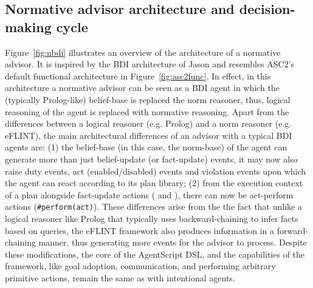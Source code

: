 \subsection{Normative advisor architecture and decision-making cycle}
Figure~\ref{fig:nbdi} illustrates an overview of the architecture of a normative advisor.
It is inspired by the BDI architecture of Jason \cite{Bordini2005} and resembles ASC2's default functional architecture in Figure~\ref{fig:asc2func}.
%
In effect, in this architecture a normative advisor can be seen as a BDI agent in which the (typically Prolog-like) belief-base is replaced the norm reasoner, thus, logical reasoning of the agent is replaced with normative reasoning. Apart from the differences between a logical reasoner (e.g. Prolog) and a norm reasoner (e.g. eFLINT), the main architectural differences of an advisor with a typical BDI agents are: (1) the belief-base (in this case, the norm-base) of the agent can generate more than just belief-update (or fact-update) events, it may now also raise duty events, act (enabled/disabled) events and violation events upon which the agent can react  according to its plan library; (2) from the execution context of a plan alongside fact-update actions ( and ), there can now be act-perform actions (\texttt{#perform(act)}). These differences arise from the the fact that unlike a logical reasoner like Prolog that typically uses backward-chaining to infer facts based on queries, the eFLINT framework also produces information in a forward-chaining manner, thus generating more events for the advisor to process.
%
Despite these modifications, the core of the AgentScript DSL, and the capabilities of the framework, like goal adoption, communication, and performing arbitrary primitive actions, remain the same as with intentional agents. 
%

